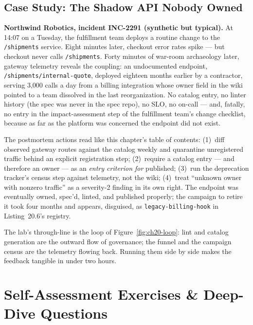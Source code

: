 \subsection{Case Study: The Shadow API Nobody Owned}
\begin{examplebox}
\textbf{Northwind Robotics, incident INC-2291 (synthetic but typical).}
At 14:07 on a Tuesday, the fulfillment team deploys a routine change to
the \texttt{/shipments} service. Eight minutes later, checkout error
rates spike --- but checkout never calls \texttt{/shipments}. Forty
minutes of war-room archaeology later, gateway telemetry reveals the
coupling: an undocumented endpoint, \texttt{/shipments/internal-quote},
deployed eighteen months earlier by a contractor, serving 3{,}000 calls a
day from a billing integration whose owner field in the wiki pointed to a
team dissolved in the last reorganization. No catalog entry, no linter
history (the spec was never in the spec repo), no SLO, no on-call ---
and, fatally, no entry in the impact-assessment step of the fulfillment
team's change checklist, because as far as the platform was concerned the
endpoint did not exist.

The postmortem actions read like this chapter's table of contents:
(1)~diff observed gateway routes against the catalog weekly and quarantine
unregistered traffic behind an explicit registration step; (2)~require a
catalog entry --- and therefore an owner --- as an \emph{entry criterion
for} \textsf{published}; (3)~run the deprecation tracker's census step
against telemetry, not the wiki; (4)~treat ``unknown owner with nonzero
traffic'' as a severity-2 finding in its own right. The endpoint was
eventually owned, spec'd, linted, and published properly; the campaign to
retire it took four months and appears, disguised, as
\texttt{legacy-billing-hook} in Listing~20.6's registry.
\end{examplebox}

The lab's through-line is the loop of Figure~\ref{fig:ch20-loop}: lint and
catalog generation are the outward flow of governance; the funnel and the
campaign census are the telemetry flowing back. Running them side by side
makes the feedback tangible in under two hours.

\section{Self-Assessment Exercises \& Deep-Dive Questions}
\label{sec:ch20-exercises}

